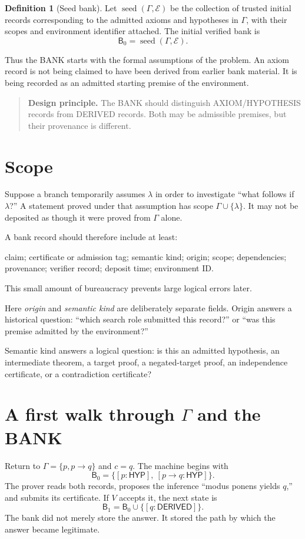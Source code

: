 \documentclass[11pt,openany]{book}
\theoremstyle{definition}
\newtheorem{definition}[theorem]{Definition}
\theoremstyle{remark}
\newenvironment{designbox}{\begin{quote}\small\color{green!35!black}\textbf{Design principle.} }{\end{quote}}
\newcommand{\Bank}{\mathsf{B}}
\newcommand{\Env}{\mathcal{E}}
\begin{document}
\begin{definition}[Seed bank]
Let $\operatorname{seed}(\Gamma,\Env)$ be the collection of trusted initial records corresponding to the admitted axioms and hypotheses in $\Gamma$, with their scopes and environment identifier attached. The initial verified bank is
\[
\Bank_0=\operatorname{seed}(\Gamma,\Env).
\]
\end{definition}
Thus the BANK starts with the formal assumptions of the problem. An axiom record is not being claimed to have been derived from earlier bank material. It is being recorded as an admitted starting premise of the environment.

\begin{designbox}
The BANK should distinguish \textsf{AXIOM/HYPOTHESIS} records from \textsf{DERIVED} records. Both may be admissible premises, but their provenance is different.
\end{designbox}

\section{Scope}
Suppose a branch temporarily assumes $\lambda$ in order to investigate ``what follows if $\lambda$?'' A statement proved under that assumption has scope $\Gamma\cup\{\lambda\}$. It may not be deposited as though it were proved from $\Gamma$ alone.

A bank record should therefore include at least:
\begin{center}
claim; certificate or admission tag; semantic kind; origin; scope; dependencies; provenance; verifier record; deposit time; environment ID.
\end{center}
This small amount of bureaucracy prevents large logical errors later.

Here \emph{origin} and \emph{semantic kind} are deliberately separate fields. Origin answers a historical question: ``which search role submitted this record?'' or ``was this premise admitted by the environment?''\par
Semantic kind answers a logical question: is this an admitted hypothesis, an intermediate theorem, a target proof, a negated-target proof, an independence certificate, or a contradiction certificate?

\section{A first walk through \texorpdfstring{$\Gamma$}{Gamma} and the BANK}
Return to $\Gamma=\{p,p\to q\}$ and $c=q$. The machine begins with
\[
\Bank_0=\{[p:\textsf{HYP}],\ [p\to q:\textsf{HYP}]\}.
\]
The prover reads both records, proposes the inference ``modus ponens yields $q$,'' and submits its certificate. If $V$ accepts it, the next state is
\[
\Bank_1=\Bank_0\cup\{[q:\textsf{DERIVED}]\}.
\]
The bank did not merely store the answer. It stored the path by which the answer became legitimate.
\end{document}
